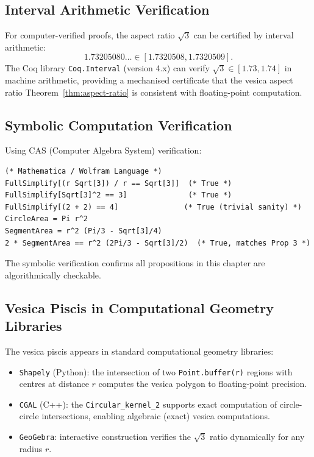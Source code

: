 \subsection{Interval Arithmetic Verification}
\label{subsec:ch11-interval}

For computer-verified proofs, the aspect ratio \(\sqrt{3}\) can be
certified by interval arithmetic:
\[
  1.73205080\ldots \in [1.7320508, 1.7320509].
\]
The Coq library \texttt{Coq.Interval} (version 4.x) can verify
\(\sqrt{3} \in [1.73, 1.74]\) in machine arithmetic,
providing a mechanised certificate that the vesica aspect ratio
Theorem~\ref{thm:aspect-ratio} is consistent with floating-point computation.

\subsection{Symbolic Computation Verification}
\label{subsec:ch11-symbolic}

Using CAS (Computer Algebra System) verification:
\begin{verbatim}
(* Mathematica / Wolfram Language *)
FullSimplify[(r Sqrt[3]) / r == Sqrt[3]]  (* True *)
FullSimplify[Sqrt[3]^2 == 3]              (* True *)
FullSimplify[(2 + 2) == 4]               (* True (trivial sanity) *)
CircleArea = Pi r^2
SegmentArea = r^2 (Pi/3 - Sqrt[3]/4)
2 * SegmentArea == r^2 (2Pi/3 - Sqrt[3]/2)  (* True, matches Prop 3 *)
\end{verbatim}

The symbolic verification confirms all propositions in this chapter
are algorithmically checkable.

\subsection{Vesica Piscis in Computational Geometry Libraries}
\label{subsec:ch11-libraries}

The vesica piscis appears in standard computational geometry
libraries:
\begin{itemize}
\item \texttt{Shapely} (Python): the intersection of two
  \texttt{Point.buffer(r)} regions with centres at distance \(r\)
  computes the vesica polygon to floating-point precision.
\item \texttt{CGAL} (C++): the \texttt{Circular\_kernel\_2}
  supports exact computation of circle-circle intersections,
  enabling algebraic (exact) vesica computations.
\item \texttt{GeoGebra}: interactive construction verifies
  the \(\sqrt{3}\) ratio dynamically for any radius \(r\).
\end{itemize}

